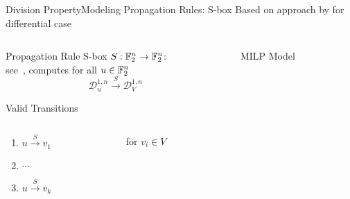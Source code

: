 \begin{frame}{Division Property}{Modeling Propagation Rules: S-box}
    \centering
    Based on approach by \textcite{AC:SHWQMS14} for differential case
    \begin{columns}
        \begin{column}{0.35\textwidth}
            \begin{block}{Propagation Rule}
                \centering
                S-box $S : \mathbb{F}_2^n \to \mathbb{F}_2^n$:\\
                see~\cite[Algorithm~2]{AC:XZBL16},
                computes for all $u \in \mathbb{F}_2^n$\\
                \vspace*{-15pt}
                \begin{equation*}
                    \mathcal{D}^{1,n}_{u} \stackrel{S}{\to} \mathcal{D}^{1,n}_V
                \end{equation*}
            \end{block}
            \begin{block}{Valid Transitions}
                \begin{columns}
                    \begin{column}{0.5\linewidth}
                        \begin{enumerate}
                            \item \quad $u \stackrel{S}{\to} v_1$
                            \item[] \quad \hspace{4pt} $\cdots$
                            \item[\tikz{\node[scale=0.8,minimum width=2pt,minimum height=2pt,color=white,fill=saphierblau]{\scriptsize k}}] \quad $u \stackrel{S}{\to} v_k$
                        \end{enumerate}
                    \end{column}
                    \begin{column}{0.5\linewidth}
                        for $v_i \in V$
                    \end{column}
                \end{columns}
            \end{block}
            \pause
        \end{column}
        \begin{column}{0.575\textwidth}
            \begin{block}{MILP Model}
            \begin{itemize}

\end{itemize}
\end{block}
\end{column}
\end{columns}
\end{frame}
